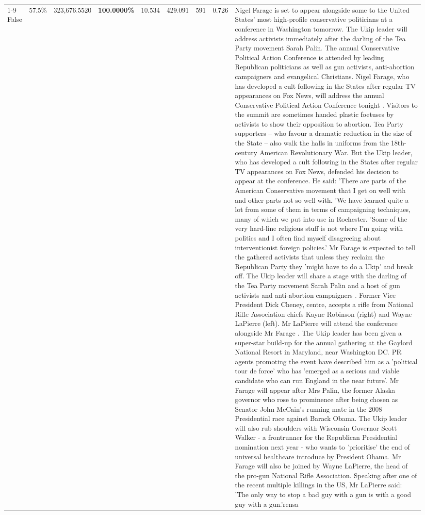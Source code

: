 \begin{table}[H]
\begin{tabular}{lllrlllll}
\cline{1-9}
False & 57.5\% & 323,676.5520 & \bfseries \color{red} 100.0000\% & 10.534 & 429.091 & 591 & 0.726 & Nigel Farage is set to appear alongside some to the United States' most high-profile conservative politicians at a conference in Washington tomorrow. The Ukip leader will address activists immediately after the darling of the Tea Party movement Sarah Palin. The annual Conservative Political Action Conference is attended by leading Republican politicians as well as gun activists, anti-abortion campaigners and evangelical Christians. Nigel Farage, who has developed a cult following in the States after regular TV appearances on Fox News, will address the annual Conservative Political Action Conference tonight . Visitors to the summit are sometimes handed plastic foetuses by activists to show their opposition to abortion. Tea Party supporters – who favour a dramatic reduction in the size of the State – also walk the halls in uniforms from the 18th-century American Revolutionary War. But the Ukip leader, who has developed a cult following in the States after regular TV appearances on Fox News, defended his decision to appear at the conference. He said: 'There are parts of the American Conservative movement that I get on well with and other parts not so well with. 'We have learned quite a lot from some of them in terms of campaigning techniques, many of which we put into use in Rochester. 'Some of the very hard-line religious stuff is not where I'm going with politics and I often find myself disagreeing about interventionist foreign policies.' Mr Farage is expected to tell the gathered activists that unless they reclaim the Republican Party they 'might have to do a Ukip' and break off. The Ukip leader will share a stage with the darling of the Tea Party movement Sarah Palin and a host of gun activists and anti-abortion campaigners . Former Vice President Dick Cheney, centre, accepts a rifle from National Rifle Association chiefs Kayne Robinson (right) and Wayne LaPierre (left). Mr LaPierre will attend the conference alongside Mr Farage . The Ukip leader has been given a super-star build-up for the annual gathering at the Gaylord National Resort in Maryland, near Washington DC. PR agents promoting the event have described him as a 'political tour de force' who has 'emerged as a serious and viable candidate who can run England in the near future'. Mr Farage will appear after Mrs Palin, the former Alaska governor who rose to prominence after being chosen as Senator John McCain's running mate in the 2008 Presidential race against Barack Obama. The Ukip leader will also rub shoulders with Wisconsin Governor Scott Walker - a frontrunner for the Republican Presidential nomination next year - who wants to 'prioritise' the end of universal healthcare introduce by President Obama. Mr Farage will also be joined by Wayne LaPierre, the head of the pro-gun National Rifle Association. Speaking after one of the recent multiple killings in the US, Mr LaPierre said: 'The only way to stop a bad guy with a gun is with a good guy with a gun.'rensa \\

\end{tabular}
\end{table}
